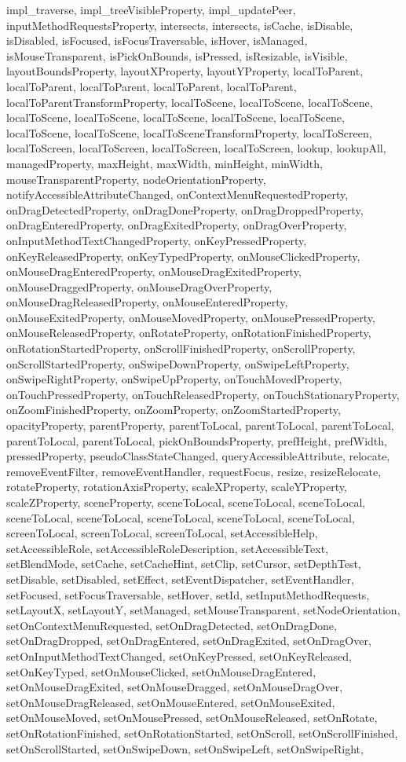 {{{{{{{{{{{{{{{{{{{{{{{{{{{{{impl\_traverse, impl\_treeVisibleProperty, impl\_updatePeer, inputMethodRequestsProperty, intersects, intersects, isCache, isDisable, isDisabled, isFocused, isFocusTraversable, isHover, isManaged, isMouseTransparent, isPickOnBounds, isPressed, isResizable, isVisible, layoutBoundsProperty, layoutXProperty, layoutYProperty, localToParent, localToParent, localToParent, localToParent, localToParent, localToParentTransformProperty, localToScene, localToScene, localToScene, localToScene, localToScene, localToScene, localToScene, localToScene, localToScene, localToScene, localToSceneTransformProperty, localToScreen, localToScreen, localToScreen, localToScreen, localToScreen, lookup, lookupAll, managedProperty, maxHeight, maxWidth, minHeight, minWidth, mouseTransparentProperty, nodeOrientationProperty, notifyAccessibleAttributeChanged, onContextMenuRequestedProperty, onDragDetectedProperty, onDragDoneProperty, onDragDroppedProperty, onDragEnteredProperty, onDragExitedProperty, onDragOverProperty, onInputMethodTextChangedProperty, onKeyPressedProperty, onKeyReleasedProperty, onKeyTypedProperty, onMouseClickedProperty, onMouseDragEnteredProperty, onMouseDragExitedProperty, onMouseDraggedProperty, onMouseDragOverProperty, onMouseDragReleasedProperty, onMouseEnteredProperty, onMouseExitedProperty, onMouseMovedProperty, onMousePressedProperty, onMouseReleasedProperty, onRotateProperty, onRotationFinishedProperty, onRotationStartedProperty, onScrollFinishedProperty, onScrollProperty, onScrollStartedProperty, onSwipeDownProperty, onSwipeLeftProperty, onSwipeRightProperty, onSwipeUpProperty, onTouchMovedProperty, onTouchPressedProperty, onTouchReleasedProperty, onTouchStationaryProperty, onZoomFinishedProperty, onZoomProperty, onZoomStartedProperty, opacityProperty, parentProperty, parentToLocal, parentToLocal, parentToLocal, parentToLocal, parentToLocal, pickOnBoundsProperty, prefHeight, prefWidth, pressedProperty, pseudoClassStateChanged, queryAccessibleAttribute, relocate, removeEventFilter, removeEventHandler, requestFocus, resize, resizeRelocate, rotateProperty, rotationAxisProperty, scaleXProperty, scaleYProperty, scaleZProperty, sceneProperty, sceneToLocal, sceneToLocal, sceneToLocal, sceneToLocal, sceneToLocal, sceneToLocal, sceneToLocal, sceneToLocal, screenToLocal, screenToLocal, screenToLocal, setAccessibleHelp, setAccessibleRole, setAccessibleRoleDescription, setAccessibleText, setBlendMode, setCache, setCacheHint, setClip, setCursor, setDepthTest, setDisable, setDisabled, setEffect, setEventDispatcher, setEventHandler, setFocused, setFocusTraversable, setHover, setId, setInputMethodRequests, setLayoutX, setLayoutY, setManaged, setMouseTransparent, setNodeOrientation, setOnContextMenuRequested, setOnDragDetected, setOnDragDone, setOnDragDropped, setOnDragEntered, setOnDragExited, setOnDragOver, setOnInputMethodTextChanged, setOnKeyPressed, setOnKeyReleased, setOnKeyTyped, setOnMouseClicked, setOnMouseDragEntered, setOnMouseDragExited, setOnMouseDragged, setOnMouseDragOver, setOnMouseDragReleased, setOnMouseEntered, setOnMouseExited, setOnMouseMoved, setOnMousePressed, setOnMouseReleased, setOnRotate, setOnRotationFinished, setOnRotationStarted, setOnScroll, setOnScrollFinished, setOnScrollStarted, setOnSwipeDown, setOnSwipeLeft, setOnSwipeRight, }}}}}}}}}}}}}}}}}}}}}}}}}}}}}

